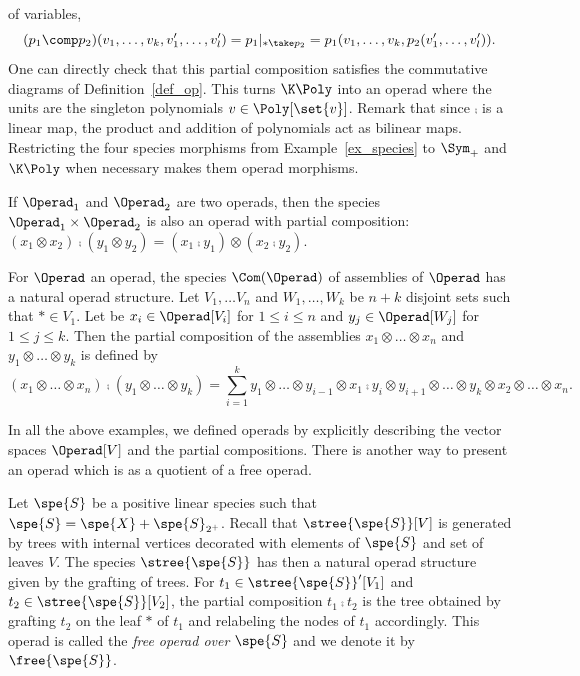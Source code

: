 \begin{description}
    of variables,
    \begin{equation}\label{pol_composition}
        (p_1\comp p_2)(v_1,\dots,v_k,v_1',\dots,v_l') = p_1|_{\ast \take p_2}
        = p_1(v_1,\dots, v_{k},p_2(v_1',\dots,v_l')).
    \end{equation}
    One can directly check that this partial composition satisfies the commutative diagrams of
    Definition~\ref{def_op}. This turns $\K\Poly$ into an operad where the units are the singleton 
    polynomials $v\in\Poly[\set{v}]$. Remark that since $\comp$ is a linear map, the product and
    addition of polynomials act as bilinear maps. Restricting the four species morphisms from 
    Example~\ref{ex_species} to $\Sym_+$ and $\K\Poly$ when necessary makes them operad morphisms.
    
    \item[Hadamard product.] If $\Operad_1$ and $\Operad_2$ are two operads, then the species 
    $\Operad_1\times\Operad_2$ is also an operad with partial composition: 
    $(x_1\otimes x_2)\comp (y_1\otimes y_2) =(x_1\comp y_1)\otimes (x_2\comp y_2)$. 
    
    \item[Assemblies.] For $\Operad$ an operad, the species $\Com(\Operad)$ of assemblies of $\Operad$ has 
    a natural operad structure. Let $V_1,\dots V_n$ and $W_1,\dots, W_k$ be $n+k$ disjoint sets such that 
    $\ast\in V_1$. Let be $x_i\in \Operad[V_i]$ for $1\leq i\leq n$ and $y_j\in\Operad[W_j]$ for 
    $1\leq j\leq k$.
    Then the partial composition of the assemblies $x_1\otimes\dots\otimes x_n$ and 
    $y_1\otimes\dots\otimes y_k$ is defined by
    $$(x_1\otimes\dots\otimes x_n) \comp (y_1\otimes\dots\otimes y_k) 
    = \sum_{i=1}^k y_1\otimes\dots\otimes y_{i-1}\otimes x_1\comp y_i \otimes y_{i+1}\otimes\dots\otimes y_k \otimes x_2\otimes\dots\otimes x_n.$$
\end{description}

In all the above examples, we defined operads by explicitly describing the vector spaces $\Operad[V]$ and 
the partial compositions. There is another way to present an operad which is as a quotient of a free operad.

Let $\spe{S}$ be a positive linear species such that $\spe{S}=\spe{X}+\spe{S}_{2^+}$. Recall that 
$\stree{\spe{S}}[V]$ is generated by trees with internal vertices decorated with elements of $\spe{S}$ 
and set of leaves $V$.
The species $\stree{\spe{S}}$ has then a natural operad structure given by the grafting of trees. For 
$t_1\in\stree{\spe{S}}'[V_1]$ and $t_2\in\stree{\spe{S}}[V_2]$, the partial composition $t_1\comp t_2$ is 
the tree obtained by grafting $t_2$ on the leaf $\ast$ of $t_1$ and relabeling the nodes of $t_1$ accordingly. 
This operad is called the {\em free operad over $\spe{S}$} and we denote it by $\free{\spe{S}}$.


